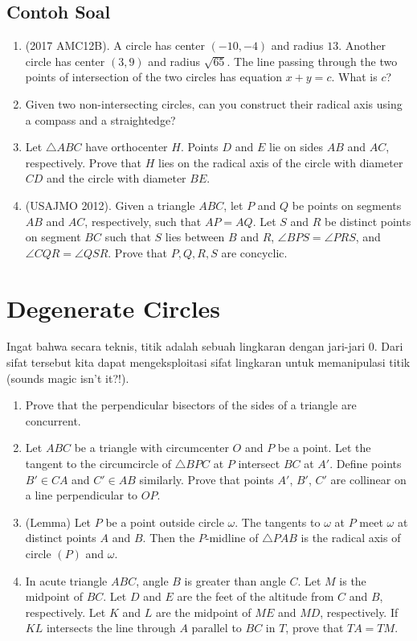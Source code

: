 \documentclass[11pt]{scrartcl}
\begin{document}
\subsection{Contoh Soal}
\begin{enumerate}
    \item (2017 AMC12B). A circle has center $(-10, -4)$ and radius $13$. Another circle has center $(3, 9)$ and radius $\sqrt{65}$. The line passing through the two points of intersection of the two circles has equation $x + y = c$. What is $c$?
\item Given two non-intersecting circles, can you construct their radical axis using a compass and a straightedge?
\item Let $\triangle ABC$ have orthocenter $H$. Points $D$ and $E$ lie on sides $AB$ and $AC$, respectively. Prove that $H$ lies on the radical axis of the circle with diameter $CD$ and the circle with diameter $BE$.
\item (USAJMO 2012). Given a triangle $ABC$, let $P$ and $Q$ be points on segments $AB$ and $AC$, respectively, such that $AP = AQ$. Let $S$ and $R$ be distinct points on segment $BC$ such that $S$ lies between $B$ and $R$, $\angle BPS = \angle PRS$, and $\angle CQR = \angle QSR$. Prove that $P, Q, R, S$ are concyclic.
 \end{enumerate}

 \section{Degenerate Circles}
Ingat bahwa secara teknis, titik adalah sebuah lingkaran dengan jari-jari 0. Dari sifat tersebut kita dapat mengeksploitasi sifat lingkaran untuk memanipulasi titik (sounds magic isn't it?!).

\begin{enumerate}
    \item Prove that the perpendicular bisectors of the sides of a triangle are concurrent.
\item Let $ABC$ be a triangle with circumcenter $O$ and $P$ be a point. Let the tangent to the circumcircle of $\triangle BPC$ at $P$ intersect $BC$ at $A'$. Define points $B' \in CA$ and $C' \in AB$ similarly. Prove that points $A'$, $B'$, $C'$ are collinear on a line perpendicular to $OP$.
\item (Lemma) Let $P$ be a point outside circle $\omega$. The tangents to $\omega$ at $P$ meet $\omega$ at distinct points $A$ and $B$. Then the $P$-midline of $\triangle PAB$ is the radical axis of circle $(P)$ and $\omega$.
\item In acute triangle $ABC$, angle $B$ is greater than angle $C$. Let $M$ is the midpoint of $BC$. Let $D$ and $E$ are the feet of the altitude from $C$ and $B$, respectively. Let $K$ and $L$ are the midpoint of $ME$ and $MD$, respectively. If $KL$ intersects the line through $A$ parallel to $BC$ in $T$, prove that $TA = TM$.
\end{enumerate}
\end{document}
